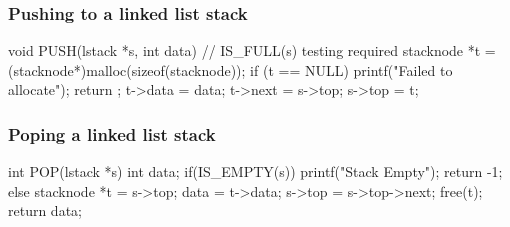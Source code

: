 \documentclass[newPxFont,sthlmFooter,nooffset]{beamer}
\begin{document}
\begin{frame}[t, fragile]
  \frametitle{Pushing to a linked list stack}
  \begin{ncodedef}
void PUSH(lstack *s, int data) {
    // IS_FULL(s) testing required
    stacknode *t = (stacknode*)malloc(sizeof(stacknode));
    if (t == NULL) {
        printf("Failed to allocate\n");
        return ;
    }
    t->data = data;
    t->next = s->top;
    s->top = t;
}  
  \end{ncodedef}
\end{frame}


\begin{frame}[t, fragile]
  \frametitle{Poping a linked list stack}
  \begin{ncodedef}
int POP(lstack *s) {
  int data;
  if(IS_EMPTY(s)) {
    printf("Stack Empty\n");
    return -1;
  }
  else {
    stacknode *t = s->top;
    data = t->data;
    s->top = s->top->next;
    free(t);
    return data;
  }
}    
  \end{ncodedef}
\end{frame}
\end{document}
